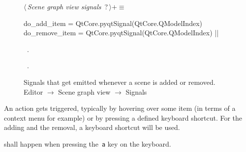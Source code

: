 \documentclass[%
    a4paper,    %
    justified,  %
    nobib,      %
    openany     %
]{tufte-book}
\begin{document}
\begin{figure}
\begin{flushleft} \small
\begin{minipage}{\linewidth}\label{scrap46}\raggedright\small
{} $\langle\,${\itshape Scene graph view signals}\nobreak\ {\footnotesize {?}}$\,\rangle+\equiv$
\vspace{-1ex}
\begin{pythoncode}
do_add_item = QtCore.pyqtSignal(QtCore.QModelIndex)
do_remove_item = QtCore.pyqtSignal(QtCore.QModelIndex)
|\NWsep|
\end{pythoncode}
\vspace{1.5ex}
\footnotesize
\begin{list}{}{\setlength{\itemsep}{-\parsep}\setlength{\itemindent}{-\leftmargin}}
\item \NWtxtMacroDefBy\ .
\item \NWtxtMacroRefIn\ .

\item{}
\end{list}
\end{minipage}\vspace{4ex}
\end{flushleft}
\caption{Signals that get emitted whenever a scene is added or removed.
  \newline{}\newline{}Editor $\rightarrow$ Scene graph view
  $\rightarrow$ Signals}
\label{editor:lst:scene-graph-view:signals:do-add-remove-item}
\end{figure}

An action gets triggered, typically by hovering over some item (in terms of a
context menu for example) or by pressing a defined keyboard shortcut. For the
adding and the removal, a keyboard shortcut will be used.

 shall happen when pressing the~\verb=a= key
on the keyboard.
\end{document}
